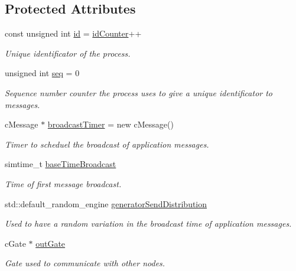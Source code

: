 \subsection*{Protected Attributes}
\begin{DoxyCompactItemize}
\item 
const unsigned int \hyperlink{class_node_base_a2924723bf530b8304c5e028504aafd84}{id} = \hyperlink{class_node_base_a3d577a517665ac5bcf9ed9495945fe31}{id\+Counter}++
\begin{DoxyCompactList}\small\item\em Unique identificator of the process. \end{DoxyCompactList}\item 
unsigned int \hyperlink{class_node_base_a4fe5b1b7aeb49d15ec7986133346aeb7}{seq} = 0
\begin{DoxyCompactList}\small\item\em Sequence number counter the process uses to give a unique identificator to messages. \end{DoxyCompactList}\item 
c\+Message $\ast$ \hyperlink{class_node_base_a8b7bd31bf2bef92de75a2b565c42fd8a}{broadcast\+Timer} = new c\+Message()
\begin{DoxyCompactList}\small\item\em Timer to scheduel the broadcast of application messages. \end{DoxyCompactList}\item 
simtime\+\_\+t \hyperlink{class_node_base_a199676fc8bd0203c7241f58779c5921c}{base\+Time\+Broadcast}
\begin{DoxyCompactList}\small\item\em Time of first message broadcast. \end{DoxyCompactList}\item 
std\+::default\+\_\+random\+\_\+engine \hyperlink{class_node_base_a2c488fd8adf4d208593a6e6eba4d6220}{generator\+Send\+Distribution}
\begin{DoxyCompactList}\small\item\em Used to have a random variation in the broadcast time of application messages. \end{DoxyCompactList}\item 
c\+Gate $\ast$ \hyperlink{class_node_base_a2e86bd53e181f8b488130032da547f8e}{out\+Gate}
\begin{DoxyCompactList}\small\item\em Gate used to communicate with other nodes. \end{DoxyCompactList}\item 

\end{DoxyCompactItemize}

